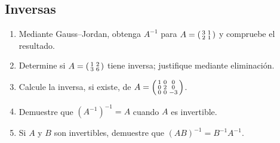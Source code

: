 \documentclass[12pt]{article}
\theoremstyle{remark}
\newcounter{contadorEjercicio}
\newenvironment{listaejercicios}{\begin{enumerate}[label=\textbf{E\arabic*.},leftmargin=2.4em,itemsep=0.52em]\setcounter{enumi}{\value{contadorEjercicio}}}{\setcounter{contadorEjercicio}{\value{enumi}}\end{enumerate}}
\begin{document}
\subsection{Inversas}
\begin{listaejercicios}
\item Mediante Gauss--Jordan, obtenga $A^{-1}$ para $A=\begin{psmallmatrix}3&1\\2&1\end{psmallmatrix}$ y compruebe el resultado.
\item Determine si $A=\begin{psmallmatrix}1&2\\3&6\end{psmallmatrix}$ tiene inversa; justifique mediante eliminación.
\item Calcule la inversa, si existe, de $A=\begin{psmallmatrix}1&0&0\\0&2&0\\0&0&-3\end{psmallmatrix}$.
\item Demuestre que $(A^{-1})^{-1}=A$ cuando $A$ es invertible.
\item Si $A$ y $B$ son invertibles, demuestre que $(AB)^{-1}=B^{-1}A^{-1}$.
\end{listaejercicios}
\end{document}

